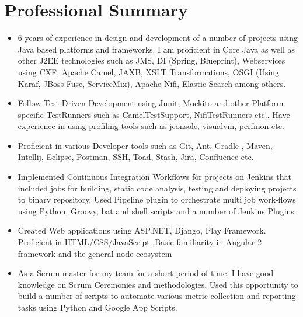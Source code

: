 \documentclass[letterpaper]{twentysecondcv} %
\begin{document}
\section{Professional Summary}

\begin{itemize}
\item 6 years of experience in design and development of a number of projects using Java based platforms and frameworks. I am proficient in Core Java as well as other J2EE technologies such as JMS, DI (Spring, Blueprint), Webservices using CXF, Apache Camel, JAXB, XSLT Transformations, OSGI (Using Karaf, JBoss Fuse, ServiceMix), Apache Nifi, Elastic Search among others. 

\item Follow Test Driven Development using Junit, Mockito and other Platform specific TestRunners such as CamelTestSupport, NifiTestRunners etc.. Have experience in using profiling tools such as jconsole, visualvm, perfmon etc.

\item Proficient in various Developer tools such as Git, Ant, Gradle , Maven, Intellij, Eclipse, Postman, SSH, Toad, Stash, Jira, Confluence etc.

\item Implemented Continuous Integration Workflows for projects on Jenkins that included jobs for building, static code analysis, testing and deploying projects to binary repository. Used Pipeline plugin to orchestrate multi job work-flows using Python, Groovy, bat and shell scripts and a number of Jenkins Plugins.

\item Created Web applications using ASP.NET, Django, Play Framework. Proficient in HTML/CSS/JavaScript. Basic familiarity in Angular 2 framework and the general node ecosystem

\item As a Scrum master for my team for a short period of time, I have good knowledge on Scrum Ceremonies and methodologies. Used this opportunity to build a number of scripts to automate various metric collection and reporting tasks using Python and Google App Scripts.
\end{itemize}



\end{document}
